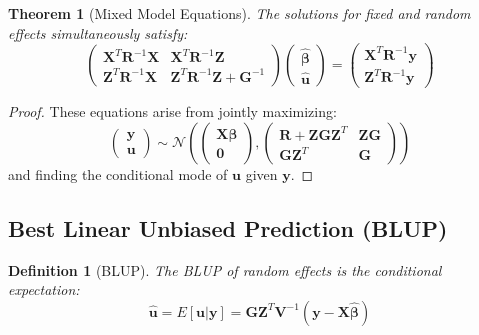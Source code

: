 \documentclass{article}
\newtheorem{definition}{Definition}
\newtheorem{theorem}{Theorem}
\begin{document}
\begin{theorem}[Mixed Model Equations]
The solutions for fixed and random effects simultaneously satisfy:
\begin{equation}
\begin{pmatrix}
\mathbf{X}^T\mathbf{R}^{-1}\mathbf{X} & \mathbf{X}^T\mathbf{R}^{-1}\mathbf{Z} \\
\mathbf{Z}^T\mathbf{R}^{-1}\mathbf{X} & \mathbf{Z}^T\mathbf{R}^{-1}\mathbf{Z} + \mathbf{G}^{-1}
\end{pmatrix}
\begin{pmatrix}
\hat{\boldsymbol{\beta}} \\
\hat{\mathbf{u}}
\end{pmatrix} = 
\begin{pmatrix}
\mathbf{X}^T\mathbf{R}^{-1}\mathbf{y} \\
\mathbf{Z}^T\mathbf{R}^{-1}\mathbf{y}
\end{pmatrix}
\end{equation}
\end{theorem}

\begin{proof}
These equations arise from jointly maximizing:
\begin{equation}
\begin{pmatrix} \mathbf{y} \\ \mathbf{u} \end{pmatrix} \sim \mathcal{N}\left(\begin{pmatrix} \mathbf{X}\boldsymbol{\beta} \\ \mathbf{0} \end{pmatrix}, \begin{pmatrix} \mathbf{R} + \mathbf{ZGZ}^T & \mathbf{ZG} \\ \mathbf{GZ}^T & \mathbf{G} \end{pmatrix}\right)
\end{equation}
and finding the conditional mode of $\mathbf{u}$ given $\mathbf{y}$.
\end{proof}

\subsection{Best Linear Unbiased Prediction (BLUP)}

\begin{definition}[BLUP]
The BLUP of random effects is the conditional expectation:
\begin{equation}
\hat{\mathbf{u}} = E[\mathbf{u}|\mathbf{y}] = \mathbf{GZ}^T\mathbf{V}^{-1}(\mathbf{y} - \mathbf{X}\hat{\boldsymbol{\beta}})
\end{equation}
\end{definition}
\end{document}
